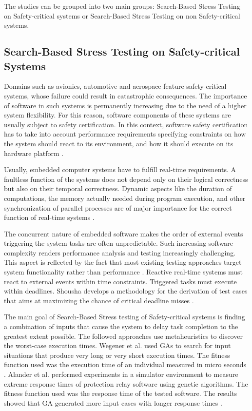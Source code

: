 \documentclass[espaco=umemeio,chapter=TITLE,twoside,openright]{abnt}
\begin{document}
The studies can be grouped into two main groups: Search-Based Stress Testing on Safety-critical systems or Search-Based Stress Testing on non Safety-critical systems.


\subsection{Search-Based Stress Testing on Safety-critical Systems}

Domains such as avionics, automotive and aerospace feature safety-critical systems, whose failure could result in catastrophic consequences.  The importance
of software in such systems is permanently increasing due to the need of a higher system
flexibility. For this reason, software components of these systems are usually subject to safety certification. In this context, software safety certification has to take into account performance requirements specifying constraints on how the system should react to its environment, and how it should execute on its hardware platform \cite{DiAlesio2013}.

Usually, embedded computer systems have to fulfill real-time requirements. A faultless function of the systems does not depend only on their logical correctness but also on their temporal correctness. Dynamic aspects like the duration of computations, the memory actually needed during program execution, and other synchronization of parallel processes are of major importance for the correct function of real-time systems  \cite{J.WegenerK.GrimmM.GrochtmannH.Sthamer1996} .

The concurrent nature of embedded software makes  the order of external events triggering the system tasks are often unpredictable. Such increasing software complexity
renders performance analysis and testing increasingly
challenging. This aspect is reflected by the fact that most existing testing approaches target system functionality rather than performance \cite{DiAlesio2013}. Reactive real-time systems must react to external events within time constraints. Triggered tasks must execute within deadlines. Shousha develops a methodology for the derivation of test cases that aims at maximizing the chance of critical deadline misses \cite{shousha2003performance}.

The main goal of Search-Based Stress testing of Safety-critical systems is finding a combination of inputs that cause the system to delay task completion to the greatest extent possible. The followed approaches use metaheuristics to discover the worst-case execution times. Wegener et al. \cite{Wegener1997} used GAs to search for input situations that produce very long or very short execution times. The fitness function used was the execution time of an individual measured in micro seconds \cite{Wegener1997}. Alander et al. \cite{Alander} performed experiments in a simulator environment to measure extreme response times of protection relay software using genetic algorithms. The fitness function used was the response time of the tested software. The results showed that GA generated more input cases with longer response times \cite{Alander}.
\end{document}
